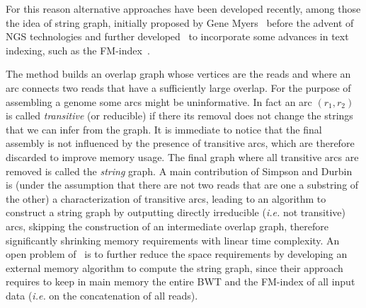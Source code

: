 \documentclass[runningheads,envcountsame,a4paper]{llncs}
\newcommand{\ie}{\textit{i.e.}\xspace}
\begin{document}
For this reason alternative approaches have been developed recently, among those
the idea of string graph, initially proposed by Gene Myers~\cite{Myers2005}
before the advent of NGS technologies and further
developed~\cite{Simpson2010,Simpson2012} to incorporate some advances in text
indexing, such as the FM-index~\cite{Ferragina2005}.

The method builds an overlap graph whose vertices are the reads and where an arc
connects two reads that have a sufficiently large overlap.
For the purpose of assembling a genome some arcs might be uninformative.
In fact an arc $(r_{1}, r_{2})$ is called \emph{transitive} (or reducible) if
there its removal does not change the strings that we can infer from the graph.
It is immediate to notice that the final assembly is not influenced by the
presence of transitive arcs, which are therefore discarded to improve memory usage.
The final graph where all transitive arcs are removed is called the \emph{string} graph.
A main contribution of
Simpson and Durbin~\cite{Simpson2010} is (under the assumption
that there are not two reads that are one a substring of the other) a
characterization of transitive arcs, leading to an algorithm to construct a string
graph by outputting directly irreducible (\ie not transitive) arcs, skipping the
construction of an intermediate overlap graph, therefore significantly shrinking
memory requirements with linear time complexity.
An open problem of~\cite{Simpson2010} is to further reduce
the space requirements by developing an external memory algorithm to compute the
string graph, since their approach requires to keep in main memory the entire
BWT and the FM-index of all input data (\ie on the concatenation of all reads).
\end{document}
